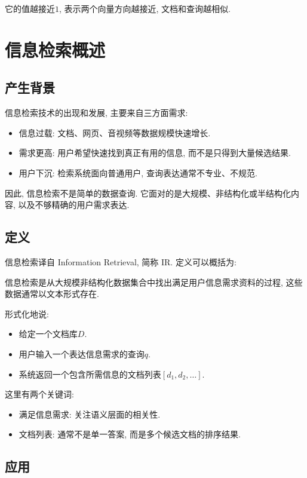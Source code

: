它的值越接近$1$, 表示两个向量方向越接近, 文档和查询越相似.

\section{信息检索概述}


\subsection{产生背景}


信息检索技术的出现和发展, 主要来自三方面需求:

\begin{itemize}
\item 信息过载: 文档、网页、音视频等数据规模快速增长.
\item 需求更高: 用户希望快速找到真正有用的信息, 而不是只得到大量候选结果.
\item 用户下沉: 检索系统面向普通用户, 查询表达通常不专业、不规范.
\end{itemize}

因此, 信息检索不是简单的数据查询.
它面对的是大规模、非结构化或半结构化内容, 以及不够精确的用户需求表达.

\subsection{定义}


信息检索译自 Information Retrieval, 简称 IR.
定义可以概括为:

信息检索是从大规模非结构化数据集合中找出满足用户信息需求资料的过程,
这些数据通常以文本形式存在.

形式化地说:

\begin{itemize}
\item 给定一个文档库$D$.
\item 用户输入一个表达信息需求的查询$q$.
\item 系统返回一个包含所需信息的文档列表$[d_1, d_2, \dots]$.
\end{itemize}

这里有两个关键词:

\begin{itemize}
\item 满足信息需求: 关注语义层面的相关性.
\item 文档列表: 通常不是单一答案, 而是多个候选文档的排序结果.
\end{itemize}

\subsection{应用}


